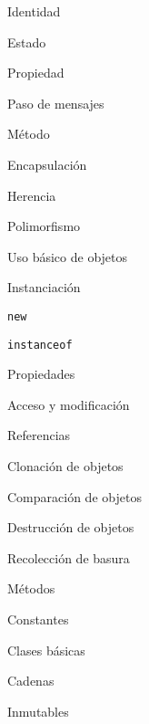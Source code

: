 \begin{longenum}
\begin{longenum}
\begin{longenum}
\begin{longenum}
            \end{longenum}
            \item Identidad
            \item Estado
            \item Propiedad
            \item Paso de mensajes
            \item Método
            \item Encapsulación
            \item Herencia
            \item Polimorfismo
        \end{longenum}
        \item Uso básico de objetos
        \begin{longenum}
            \item Instanciación
            \begin{longenum}
                \item \texttt{new}
                \item \texttt{instanceof}
            \end{longenum}
            \item Propiedades
            \begin{longenum}
                \item Acceso y modificación
            \end{longenum}
            \item Referencias
            \item Clonación de objetos
            \item Comparación de objetos
            \item Destrucción de objetos
            \begin{longenum}
                \item Recolección de basura
            \end{longenum}
            \item Métodos
            \item Constantes
        \end{longenum}
        \item Clases básicas
        \begin{longenum}
            \item Cadenas
            \begin{longenum}
                \item Inmutables
                \begin{longenum}

\end{longenum}
\end{longenum}
\end{longenum}
\end{longenum}
\end{longenum}
